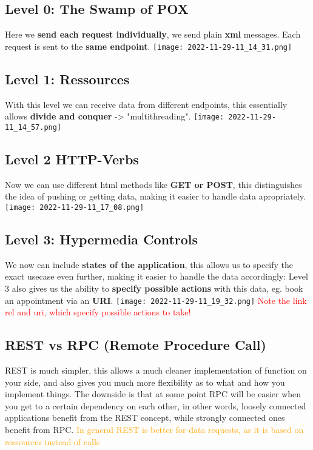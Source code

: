 \documentclass[main.tex,fontsize=6pt,paper=a4,paper=landscape,DIV=calc,]{scrartcl}
\begin{document}
\begin{multicols*}{4}
\subsection{Level 0: The Swamp of POX}  
Here we \textbf{send each request individually}, we send plain \textbf{xml} messages.\newline
Each request is sent to the \textbf{same endpoint}. 
\texttt{[image: 2022-11-29-11\_14\_31.png]}


\subsection{Level 1: Ressources}  
With this level we can receive data from different endpoints, this essentially allows \textbf{divide and conquer} -> "multithreading".\newline 
\texttt{[image: 2022-11-29-11\_14\_57.png]}

\subsection{Level 2 HTTP-Verbs}  
Now we can use different html methods like \textbf{GET or POST}, this distinguishes the idea of pushing or getting data, making it easier to handle data apropriately. \newline
\texttt{[image: 2022-11-29-11\_17\_08.png]}

\subsection{Level 3: Hypermedia Controls}  
We now can include \textbf{states of the application}, this allows us to specify the exact usecase even further, making it easier to handle the data accordingly:\newline
Level 3 also gives us the ability to \textbf{specify possible actions} with this data, eg. book an appointment via an \textbf{URI}.
\texttt{[image: 2022-11-29-11\_19\_32.png]} \newline
\textcolor{red}{Note the link rel and uri, which specify possible actions to take!}

\subsection{REST vs RPC (Remote Procedure Call)}  
REST is much simpler, this allows a much cleaner implementation of function on your side, and also gives you much more flexibility as to what and how you implement things. \newline
The downside is that at some point RPC will be easier when you get to a certain dependency on each other, in other words, loosely connected applications benefit from the REST concept, while strongly connected ones benefit from RPC.\newline 
\textcolor{orange}{In general REST is better for data requests, as it is based on ressources instead of calls}


\end{multicols*}
\end{document}
